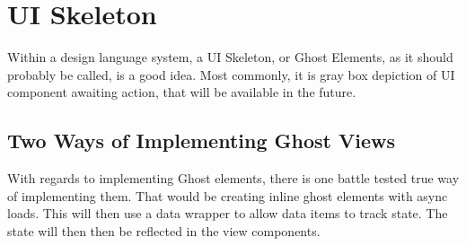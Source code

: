 \section{ UI Skeleton }
\maketitle{}

Within a design language system, a UI Skeleton, or Ghost Elements, as it should
probably be called, is a good idea. Most commonly, it is gray box depiction of
UI component awaiting action, that will be available in the future.

\subsection{ Two Ways of Implementing Ghost Views }
With regards to implementing Ghost elements, there is one battle tested true
way of implementing them. That would be creating inline ghost elements with
async loads. This will then use a data wrapper to allow data items to track
state. The state will then then be reflected in the view components. 
